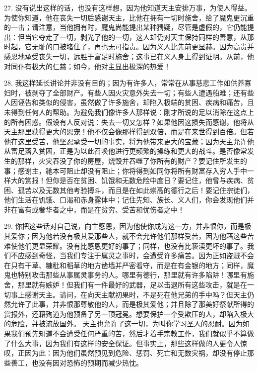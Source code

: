 27. 没有说出这样的话，也没有这样想，因为他知道天主安排万事，为使人得益。为使你知道，他在丧失一切后感谢天主，比他在拥有一切时施舍，给了魔鬼更沉重的一击；请注意，当他拥有时，魔鬼尚能提出某种猜疑，尽管是虚假的，它仍能提出：但当它夺走了一切，剥光了他的一切，这人却仍对天主保持同样的善意，从那时起，它无耻的口被堵住了，再也无可指责。因为义人比先前更显赫。因为高贵并感恩地承受丧失一切，远胜于富足时施舍；这事已在义人身上得到证明。从前，他对同仆有极大的仁慈；如今，他对主显出极深的热爱！\par

28. 我这样延长讲论并非没有目的；因为有许多人，常常在从事慈悲工作如供养寡妇时，被剥夺了全部财产。有些人因火灾意外失去一切；有些人遭遇船难；还有些人因诬告和类似的侵害，虽然做了许多施舍，却陷入极端的贫困、疾病和痛苦，且未得到任何人的帮助。为避免我们像许多人那样说：刚才所说的足以消除在这点上的所有困惑。假设有人反对说：失去一切又怎样？如果他因这损失而感谢，他将从天主那里获得更大的恩宠！他不仅会像那样得到双倍，而是在来世得到百倍。但若他在这里受苦，他坚忍承受一切的事实，将为他带来更大的宝藏；因为天主允许他从富足落入贫困，正是为以此召唤他进行更频繁的操练和更大的战斗。是否像常发生的那样，火灾吞没了你的房屋，烧毁并吞噬了你所有的财产？要记住所发生的事；感谢主，祂本可阻止却没有阻止；你将得到如同你将所有财富存入穷人手中一样大的赏报！但你是否在贫困、饥饿和无数危险中度日？要记住，他曾与疾病、贫困、孤苦以及无数其他考验搏斗，而且是在如此崇高的德行之后！要记住宗徒们，他们生活在饥饿、口渴和赤身露体中；记住先知、族长、义人们，你会发现他们并非在富有或奢华者之中，而是在贫穷、受苦和忧伤者之中！\par

29. 你把这些话对自己说，向主感恩，因为他使你成为这一方，并非恨你，而是极其爱你；因为他若没有极其爱那些人，就不会允许他们那样受苦，因为他藉这些苦难使他们更显荣耀。没有比感恩更好的事了；同样，也没有比亵渎更坏的事了。我们不应感到奇怪，当我们专注于属灵之事时，会遭受许多痛苦。因为正如盗贼不会在只有干草、糠秕和稻草的地方凿墙并严密看守，而是在有金银的地方；同样，魔鬼也特别攻击那些从事属灵事务的人。哪里有德行，那里就有许多陷阱！哪里有施舍，那里就有嫉妒！但我们有一件最好的武器，足以击退所有这些攻击，就是在一切事上感谢天主。请问，在向天主献初果时，不是死在他兄弟的手中吗？但天主仍然允许了此事，并非恨那尊敬他的人，而是极其爱他；并且除了那美好祭献所得的赏报外，还藉殉道为他预备了另一顶冠冕。想要保护一个受欺压的人，却陷入极大的危险，并被流放国外。 天主也允许了这一切，为叫你学习圣人的忍耐。因为如果我们预先知道不会遭受任何严重的苦，然后才着手宗教工作，我们就似乎不算做了什么大事，因为我们有这样的安全保证。但事实上，那些这样做的人更令人惊叹，正因为此：因为他们虽然预见到危险、惩罚、死亡和无数灾祸，却没有停止那些善工，也没有因对恐怖的预期而减少热忱。\par

